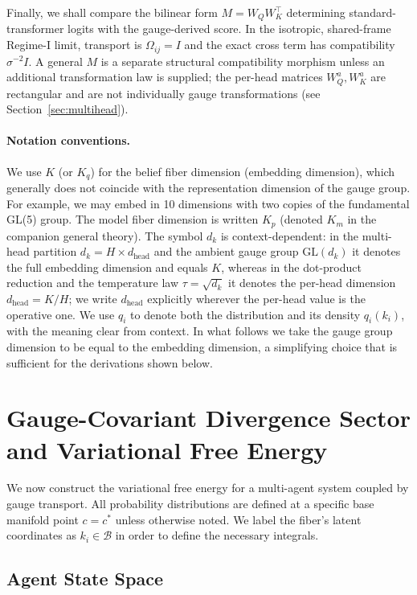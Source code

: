\documentclass[twoside,11pt]{article}
\begin{document}
Finally, we shall compare the bilinear form $M = W_QW_K^\top$ determining standard-transformer logits with the gauge-derived score. In the isotropic, shared-frame Regime-I limit, transport is $\Omega_{ij} = I$ and the exact cross term has compatibility $\sigma^{-2}I$. A general $M$ is a separate structural compatibility morphism unless an additional transformation law is supplied; the per-head matrices $W_Q^a, W_K^a$ are rectangular and are not individually gauge transformations (see Section~\ref{sec:multihead}).


\paragraph{Notation conventions.} We use $K$ (or $K_q$) for the belief fiber dimension (embedding dimension), which generally does not coincide with the representation dimension of the gauge group. For example, we may embed in 10 dimensions with two copies of the fundamental GL(5) group. The model fiber dimension is written $K_p$ (denoted $K_m$ in the companion general theory). The symbol $d_k$ is context-dependent: in the multi-head partition $d_k = H \times d_{\text{head}}$ and the ambient gauge group $\mathrm{GL}(d_k)$ it denotes the full embedding dimension and equals $K$, whereas in the dot-product reduction and the temperature law $\tau = \sqrt{d_k}$ it denotes the per-head dimension $d_{\text{head}} = K/H$; we write $d_{\text{head}}$ explicitly wherever the per-head value is the operative one. We use $q_i$ to denote both the distribution and its density $q_i(k_i)$, with the meaning clear from context. In what follows we take the gauge group dimension to be equal to the embedding dimension, a simplifying choice that is sufficient for the derivations shown below.

\section{Gauge-Covariant Divergence Sector and Variational Free Energy}
\label{sec:free_energy_section}

We now construct the variational free energy for a multi-agent system coupled by gauge transport. All probability distributions are defined at a specific base manifold point $c = c^*$ unless otherwise noted. We label the fiber's latent coordinates as $k_i \in \mathcal{B}$ in order to define the necessary integrals.

\subsection{Agent State Space}
\end{document}
